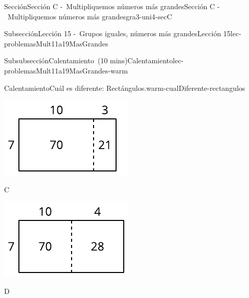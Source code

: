 \documentclass[oneside,10pt,]{article}
\begin{document}
\begin{sectionptx}{Sección}{Sección C -~Multipliquemos números más grandes}{}{Sección C -~Multipliquemos números más grandes}{}{}{gra3-uni4-secC}
\begin{subsectionptx}{Subsección}{Lección 15 -~Grupos iguales, números más grandes}{}{Lección 15}{}{}{lec-problemasMult11a19MasGrandes}
\begin{subsubsectionptx}{Subsubsección}{Calentamiento~(10 mins)}{}{Calentamiento}{}{}{lec-problemasMult11a19MasGrandes-warm}
\begin{exploration}{Calentamiento}{Cuál es diferente: Rectángulos.}{warm-cualDiferente-rectangulos}
\begin{sidebyside}{2}{0}{0}{0}
\begin{sbspanel}{0.5}
\includegraphics[width=\linewidth]{external/svg-source/tikz-file-149351-scale13.pdf}
\end{sbspanel}%
\end{sidebyside}%
\begin{sidebyside}{2}{0}{0}{0}%
\begin{sbspanel}{0.5}%
C%
\par
\includegraphics[width=\linewidth]{external/svg-source/tikz-file-149352-scale13.pdf}
\end{sbspanel}%
\begin{sbspanel}{0.5}%
D%
\par

\end{sbspanel}
\end{sidebyside}
\end{exploration}
\end{subsubsectionptx}
\end{subsectionptx}
\end{sectionptx}
\end{document}
